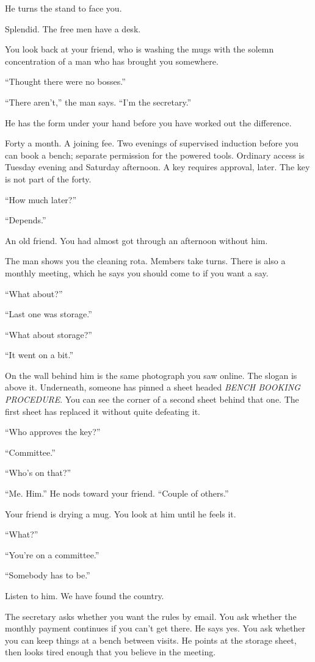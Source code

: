 \documentclass[11pt,oneside]{book}
\begin{document}
He turns the stand to face you.

Splendid. The free men have a desk.

You look back at your friend, who is washing the mugs with the solemn concentration of a man who has brought you somewhere.

``Thought there were no bosses.''

``There aren't,'' the man says. ``I'm the secretary.''

He has the form under your hand before you have worked out the difference.

Forty a month. A joining fee. Two evenings of supervised induction before you can book a bench; separate permission for the powered tools. Ordinary access is Tuesday evening and Saturday afternoon. A key requires approval, later. The key is not part of the forty.

``How much later?''

``Depends.''

An old friend. You had almost got through an afternoon without him.

The man shows you the cleaning rota. Members take turns. There is also a monthly meeting, which he says you should come to if you want a say.

``What about?''

``Last one was storage.''

``What about storage?''

``It went on a bit.''

On the wall behind him is the same photograph you saw online. The slogan is above it. Underneath, someone has pinned a sheet headed \emph{BENCH BOOKING PROCEDURE}. You can see the corner of a second sheet behind that one. The first sheet has replaced it without quite defeating it.

``Who approves the key?''

``Committee.''

``Who's on that?''

``Me. Him.'' He nods toward your friend. ``Couple of others.''

Your friend is drying a mug. You look at him until he feels it.

``What?''

``You're on a committee.''

``Somebody has to be.''

Listen to him. We have found the country.

The secretary asks whether you want the rules by email. You ask whether the monthly payment continues if you can't get there. He says yes. You ask whether you can keep things at a bench between visits. He points at the storage sheet, then looks tired enough that you believe in the meeting.
\end{document}
